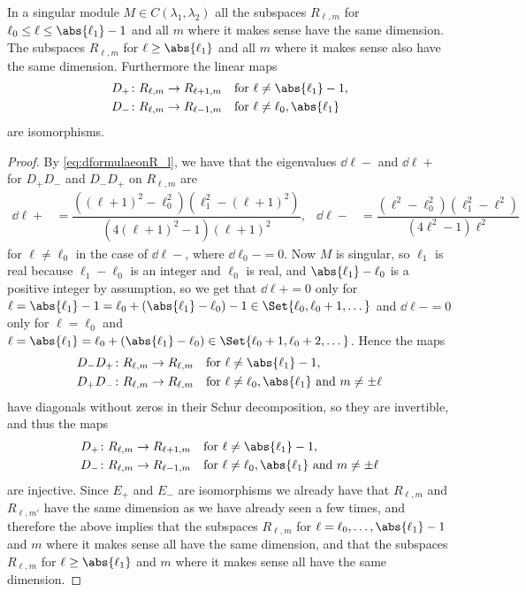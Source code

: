 \begin{lemma}
  In a singular module $M\in C(\lambda_1,\lambda_2)$ all the subspaces $R_{\ell,m}$ for $\ell_0\leq \ell\leq \abs{\ell_1}-1$ and all $m$ where it makes sense have the same dimension. The subspaces $R_{\ell,m}$ for $\ell\geq \abs{\ell_1}$ and all $m$ where it makes sense also have the same dimension. Furthermore the linear maps
  \begin{align*}
    D_+&\colon R_{\ell,m}\to R_{\ell+1,m} && \text{for }\ell\neq \abs{\ell_1}-1,\\
    D_-&\colon R_{\ell,m}\to R_{\ell-1,m} && \text{for }\ell\neq\ell_0,\abs{\ell_1}
  \end{align*}
  are isomorphisms.
\end{lemma}
\begin{proof}
  By \cref{eq:dformulaeonR_l}, we have that the eigenvalues $\dd{\ell}{-}$ and $\dd{\ell}{+}$ for $D_+D_-$ and $D_-D_+$ on $R_{\ell,m}$ are 
  \begin{align*}
    \dd{\ell}{+} &= \dfrac{((\ell+1)^2-\ell_0^2)(\ell_1^2-(\ell+1)^2)}{(4(\ell+1)^2-1)(\ell+1)^2}, & \dd{\ell}{-} &= \dfrac{(\ell^2-\ell_0^2)(\ell_1^2-\ell^2)}{(4\ell^2-1)\ell^2}
  \end{align*}
  for $\ell\neq \ell_0$ in the case of $\dd{\ell}{-}$, where $\dd{\ell_0}{-}=0$. Now $M$ is singular, so $\ell_1$ is real because $\ell_1-\ell_0$ is an integer and $\ell_0$ is real, and $\abs{\ell_1}-\ell_0$ is a positive integer by assumption, so we get that $\dd{\ell}{+}=0$ only for $\ell=\abs{\ell_1}-1=\ell_0+(\abs{\ell_1}-\ell_0)-1\in \Set{\ell_0,\ell_0+1,\dotsc}$ and $\dd{\ell}{-}=0$ only for $\ell=\ell_0$ and $\ell=\abs{\ell_1}=\ell_0+(\abs{\ell_1}-\ell_0)\in \Set{\ell_0+1,\ell_0+2,\dotsc}$. Hence the maps
  \begin{align*}
    D_-D_+&\colon R_{\ell,m}\to R_{\ell,m} && \text{for }\ell\neq \abs{\ell_1}-1,\\
    D_+D_-&\colon R_{\ell,m}\to R_{\ell,m} && \text{for }\ell\neq \ell_0,\abs{\ell_1} \text{ and }m\neq \pm \ell
  \end{align*}
  have diagonals without zeros in their Schur decomposition, so they are invertible, and thus the maps
  \begin{align*}
    D_+&\colon R_{\ell,m}\to R_{\ell+1,m} && \text{for }\ell\neq \abs{\ell_1}-1,\\
    D_-&\colon R_{\ell,m}\to R_{\ell-1,m} && \text{for }\ell\neq \ell_0,\abs{\ell_1} \text{ and }m\neq \pm \ell
  \end{align*}
  are injective. Since $E_+$ and $E_-$ are isomorphisms we already have that $R_{\ell,m}$ and $R_{\ell,m'}$ have the same dimension as we have already seen a few times, and therefore the above implies that the subspaces $R_{\ell,m}$ for $\ell=\ell_0,\dotsc,\abs{\ell_1}-1$ and $m$ where it makes sense all have the same dimension, and that the subspaces $R_{\ell,m}$ for $\ell\geq \abs{\ell_1}$ and $m$ where it makes sense all have the same dimension.
\end{proof}

